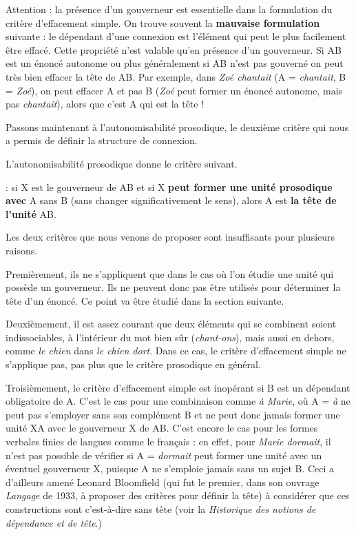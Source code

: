 Attention : la présence d’un gouverneur est essentielle dans la formulation du  critère d’effacement simple. On trouve souvent la \textbf{mauvaise formulation} suivante : le dépendant d’une connexion est l’élément qui peut le plus facilement être effacé. Cette propriété n’est valable qu’en présence d’un gouverneur. Si AB est un énoncé autonome ou plus généralement si AB n’est pas gouverné on peut très bien effacer la tête de AB. Par exemple, dans \textit{Zoé chantait} (A = \textit{chantait}, B = \textit{Zoé}), on peut effacer A et pas B (\textit{Zoé} peut former un énoncé autonome, mais pas \textit{chantait}), alors que c’est A qui est la tête !

Passons maintenant à l’autonomisabilité prosodique, le deuxième critère qui nous a permis de définir la structure de connexion.

L’autonomisabilité prosodique donne le critère suivant.

\begin{styleLivreImportant}
: si X est le gouverneur de AB et si X \textbf{peut former une unité prosodique avec} A sans B (sans changer significativement le sens), alors A est \textbf{la tête de l’unité} AB.
\end{styleLivreImportant}

Les deux critères que nous venons de proposer sont insuffisants pour plusieurs raisons.

Premièrement, ils ne s’appliquent que dans le cas où l’on étudie une unité qui possède un gouverneur. Ils ne peuvent donc pas être utilisés pour déterminer la tête d’un énoncé. Ce point va être étudié dans la section suivante.

Deuxièmement, il est assez courant que deux éléments qui se combinent soient indissociables, à l’intérieur du mot bien sûr (\textit{chant-ons}), mais aussi en dehors, comme \textit{le chien} dans \textit{le chien dort}. Dans ce cas, le critère d’effacement simple ne s’applique pas, pas plus que le critère prosodique en général.

Troisièmement, le critère d’effacement simple est inopérant si B est un dépendant obligatoire de A. C’est le cas pour une combinaison comme \textit{à Marie}, où A = \textit{à} ne peut pas s’employer sans son complément B et ne peut donc jamais former une unité XA avec le gouverneur X de AB. C’est encore le cas pour les formes verbales finies de langues comme le français : en effet, pour \textit{Marie dormait}, il n’est pas possible de vérifier si A = \textit{dormait} peut former une unité avec un éventuel gouverneur X, puisque A ne s’emploie jamais sans un sujet B. Ceci a d’ailleurs amené Leonard Bloomfield (qui fut le premier, dans son ouvrage \textit{Langage} de 1933, à proposer des critères pour définir la tête) à considérer que ces constructions sont  c’est-à-dire sans tête (voir la  \textit{Historique des notions de dépendance et de tête}.)


